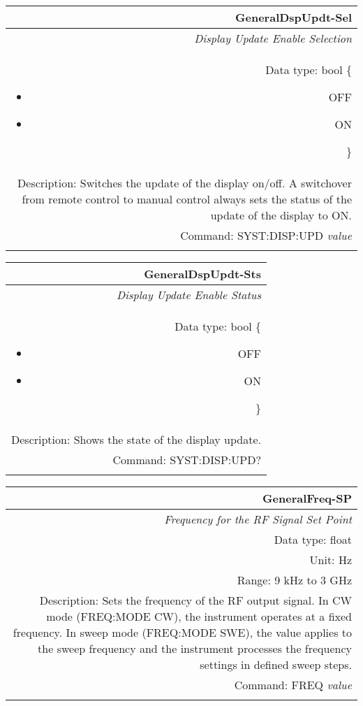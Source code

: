 \documentclass[openany]{article}
\begin{document}
		\begin{tabular}{N}
			\hline
			\bfseries GeneralDspUpdt-Sel \\ \hline
			\emph{Display Update Enable Selection} \\
			Data type: bool \{\begin{itemize}[noitemsep]
				\small
				\item[] OFF
				\item[] ON
			\end{itemize}\} \\
			Description: Switches the update of the display on/off. A switchover from remote control to manual control always sets the status of the update of the display to ON. \\
			Command: SYST:DISP:UPD \emph{value} \\
			\\ 

		\end{tabular}


		\begin{tabular}{N}
			\hline
			\bfseries GeneralDspUpdt-Sts \\ \hline
			\emph{Display Update Enable Status} \\
			Data type: bool \{\begin{itemize}[noitemsep]
				\small
				\item[] OFF
				\item[] ON
			\end{itemize}\} \\
			Description: Shows the state of the display update. \\
			Command: SYST:DISP:UPD? \\
			\\ 

		\end{tabular}


		\begin{tabular}{N}
			\hline
			\bfseries GeneralFreq-SP \\ \hline
			\emph{Frequency for the RF Signal Set Point} \\
			Data type: float \\
			Unit: Hz \\
			Range: 9 kHz to 3 GHz \\
			Description: Sets the frequency of the RF output signal. In CW mode (FREQ:MODE CW), the instrument operates at a fixed frequency. In sweep mode (FREQ:MODE SWE), the value applies to the sweep frequency and the instrument processes the frequency settings in defined sweep steps.\\
			Command: FREQ \emph{value} \\
			\\
			
		\end{tabular}
\end{document}
